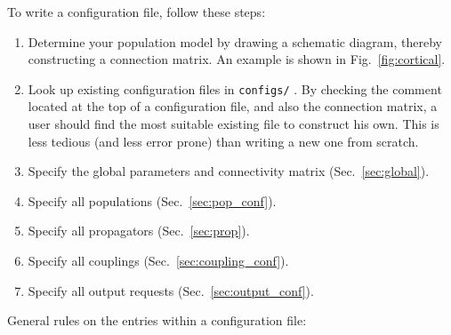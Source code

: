 \documentclass[12pt,a4paper]{article}
\newcommand{\type}[1]{{\small\small\tt #1} }
\begin{document}
To write a configuration file, follow these steps:
\begin{enumerate}
\item Determine your population model by drawing a schematic diagram, thereby constructing a connection matrix. An example is shown in Fig.~\ref{fig:cortical}.
\item Look up existing configuration files in \type{configs/}. By checking the comment located at the top of a configuration file, and also the connection matrix, a user should find the most suitable existing file to construct his own. This is less tedious (and less error prone) than writing a new one from scratch.
\item Specify the global parameters and connectivity matrix (Sec.~\ref{sec:global}).
\item Specify all populations (Sec.~\ref{sec:pop_conf}).
\item Specify all propagators (Sec.~\ref{sec:prop}).
\item Specify all couplings (Sec.~\ref{sec:coupling_conf}).
\item Specify all output requests (Sec.~\ref{sec:output_conf}).
\end{enumerate}

General rules on the entries within a configuration file:
\end{document}
